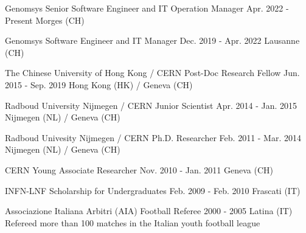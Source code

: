 
\begin{cventries}
\cventry
{Genomsys} %
{Senior Software Engineer and IT Operation Manager} %
{Apr. 2022 - Present} %
{Morges (CH)} %
{\GenomsysSenior}

\cventry
{Genomsys} %
{Software Engineer and IT Manager} %
{Dec. 2019 - Apr. 2022} %
{Lausanne (CH)} %
{\Genomsys}

\cventry
{The Chinese University of Hong Kong / CERN} %
{Post-Doc Research Fellow} %
{Jun. 2015 - Sep. 2019} %
{Hong Kong (HK) / Geneva (CH)}
{\CHUK}

\cventry
{Radboud University Nijmegen / CERN} %
{Junior Scientist} %
{Apr. 2014 - Jan. 2015} %
{Nijmegen (NL) / Geneva (CH)} %
{\JuniorScientist}

\cventry
{Radboud Univesity Nijmegen / CERN} %
{Ph.D. Researcher} %
{Feb. 2011  - Mar. 2014} %
{Nijmegen (NL) / Geneva (CH)} %
{\Phd}

\cventry
{CERN} %
{Young Associate Researcher} %
{Nov. 2010 - Jan. 2011} %
{Geneva (CH)} %
{\CERN}

\cventry
{INFN-LNF} %
{Scholarship for Undergraduates} %
{Feb. 2009 - Feb. 2010} %
{Frascati (IT)} %
{\Master}

\cventry
{Associazione Italiana Arbitri (AIA)} %
{Football Referee} %
{2000 - 2005} %
{Latina (IT)} %
{Refereed more than 100 matches in the Italian youth football league}

\end{cventries}
